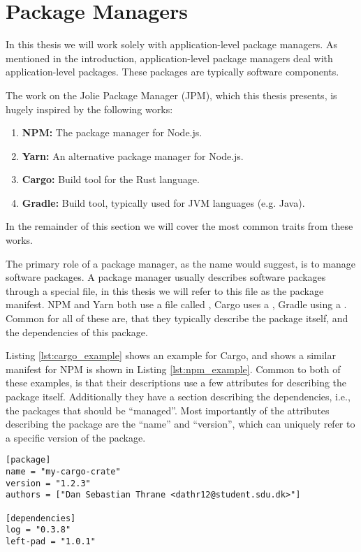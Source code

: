 \section{Package Managers}

In this thesis we will work solely with application-level package managers.
As mentioned in the introduction, application-level package managers deal with
application-level packages. These packages are typically software components.

The work on the Jolie Package Manager (JPM), which this thesis presents, is
hugely inspired by the following works:

\begin{enumerate}
    \item \textbf{NPM:} The package manager for Node.js\autocite{NPMC}.
    \item \textbf{Yarn:} An alternative package manager for 
    Node.js\autocite{YARNC}.
    \item \textbf{Cargo:} Build tool for the Rust language\autocite{CARB}.
    \item \textbf{Gradle:} Build tool, typically used for JVM languages
    (e.g. Java)\autocite{GRAB}.
\end{enumerate}

In the remainder of this section we will cover the most common traits from
these works.

The primary role of a package manager, as the name would suggest, is to manage
software packages. A package manager usually describes software packages
through a special file, in this thesis we will refer to this file as the
package manifest. NPM and Yarn both use a file called ,
Cargo uses a , Gradle using a .
Common for all of these are, that they typically describe the package itself,
and the dependencies of this package.

Listing \ref{lst:cargo_example} shows an example for Cargo, and shows a similar
manifest for NPM is shown in Listing \ref{lst:npm_example}. Common to both of
these examples, is that their descriptions use a few attributes for describing
the package itself. Additionally they have a section describing the
dependencies, i.e., the packages that should be ``managed''. Most importantly of
the attributes describing the package are the ``name'' and ``version'', which
can uniquely refer to a specific version of the package.

\begin{listing}[H]
\begin{verbatim}
[package]
name = "my-cargo-crate"
version = "1.2.3"
authors = ["Dan Sebastian Thrane <dathr12@student.sdu.dk>"]

[dependencies]
log = "0.3.8"
left-pad = "1.0.1"
\end{verbatim}
\caption{A simple manifest for a Cargo package (a ``Crate'')}
\label{lst:cargo_example}
\end{listing}


